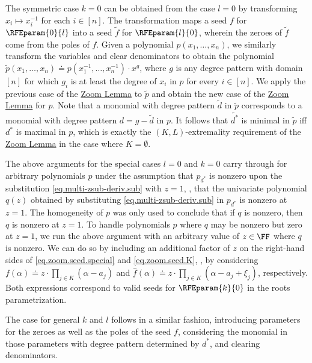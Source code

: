 \documentclass{toc}
\begin{document}
The symmetric case $k=0$ can be obtained from the case $l=0$ by transforming
$x_i \mapsto x_i^{-1}$ for each $i \in [n]$.
The transformation maps a seed $f$ for $\RFEparam{0}{l}$ into a seed
$\tilde{f}$ for $\RFEparam{l}{0}$,
wherein the zeroes of \(\tilde{f}\) come from the poles of $f$.
Given a polynomial $p(x_1,\dots,x_n)$,
we similarly transform the variables and clear denominators to obtain the
polynomial
$\tilde{p}(x_1,\dots,x_n) \doteq p(x_1^{-1},\dots,x_n^{-1}) \cdot x^{g}$,
where $g$ is any degree pattern with domain $[n]$ for which
$g_i$ is at least the degree of \(x_i\) in \(p\) for every $i \in [n]$.
We apply the previous case of the \hyperref[lem.multi-zsub-deriv]{Zoom Lemma} to $\tilde{p}$ and obtain the new
case of the \hyperref[lem.multi-zsub-deriv]{Zoom Lemma} for $p$.
Note that a monomial with degree pattern $\tilde{d}$ in $\tilde{p}$
corresponds to a monomial with degree pattern $d = g - \tilde{d}$ in
$p$.
It follows that $\widetilde{d^*}$ is minimal in $\tilde{p}$ iff $d^*$ is
maximal in $p$,
which is exactly the $(K,L)$-extremality requirement of
the \hyperref[lem.multi-zsub-deriv]{Zoom Lemma} in the
case where $K=\emptyset$.

The above arguments for the special cases $l=0$ and $k=0$ carry through for arbitrary polynomials $p$ under the assumption that $p_{d^*}$ is nonzero upon the substitution \eqref{eq.multi-zsub-deriv.sub} with $z=1$, \ie, that the univariate polynomial $q(z)$ obtained by substituting \eqref{eq.multi-zsub-deriv.sub} in $p_{d^*}$ is nonzero at $z=1$. The homogeneity of $p$ was only used to conclude that if $q$ is nonzero, then $q$ is nonzero at $z=1$. To handle polynomials $p$ where $q$ may be nonzero but zero at $z=1$, we run the above argument with an arbitrary value of $z \in \FF$ where $q$ is nonzero. We can do so by including an additional factor of $z$ on the right-hand sides of \eqref{eq.zoom.seed.special} and \eqref{eq.zoom.seed.K}, \ie, by considering
$f(\alpha) \doteq z \cdot \prod_{j\in K}(\alpha - a_j)$ and 
$\hat{f}(\alpha) \doteq z \cdot \prod_{j \in K} (\alpha - a_j + \xi_j)$, respectively. Both expressions correspond to valid seeds for $\RFEparam{k}{0}$ in the roots parametrization. 

The case for general $k$ and $l$ follows in a similar fashion, introducing parameters for the zeroes as well as the poles of the seed $f$, considering the monomial in those parameters with degree pattern determined by \(d^*\), and clearing denominators. 
\end{document}
